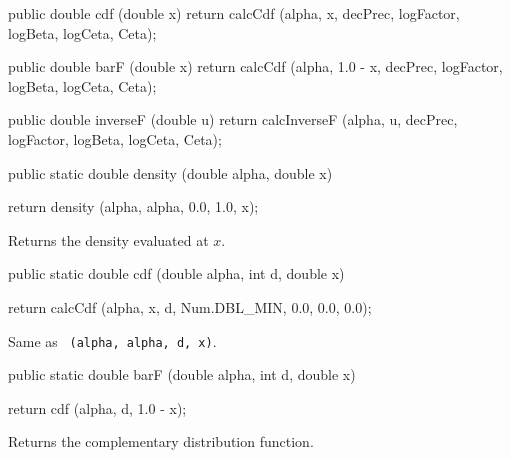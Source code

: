\begin{code}\begin{hide}

   public double cdf (double x) {
      return calcCdf (alpha, x, decPrec, logFactor, logBeta, logCeta, Ceta);
   }

   public double barF (double x) {
      return calcCdf (alpha, 1.0 - x, decPrec, logFactor, logBeta,
                      logCeta, Ceta);
   }

   public double inverseF (double u) {
      return calcInverseF (alpha, u, decPrec, logFactor, logBeta,
                           logCeta, Ceta);
   }\end{hide}

   public static double density (double alpha, double x)\begin{hide} {
      return density (alpha, alpha, 0.0, 1.0, x);
   }\end{hide}
\end{code}
\begin{tabb}
  Returns the density evaluated at $x$.
\end{tabb}
\begin{code}

   public static double cdf (double alpha, int d, double x)\begin{hide} {
      return calcCdf (alpha, x, d, Num.DBL_MIN, 0.0, 0.0, 0.0);
   }\end{hide}
\end{code}
\begin{tabb}  Same as
 ~\texttt{(alpha, alpha, d, x)}.
\end{tabb}
\begin{code}

   public static double barF (double alpha, int d, double x)\begin{hide} {
      return cdf (alpha, d, 1.0 - x);
   }\end{hide}
\end{code}
\begin{tabb} Returns the complementary distribution function.
\end{tabb}
